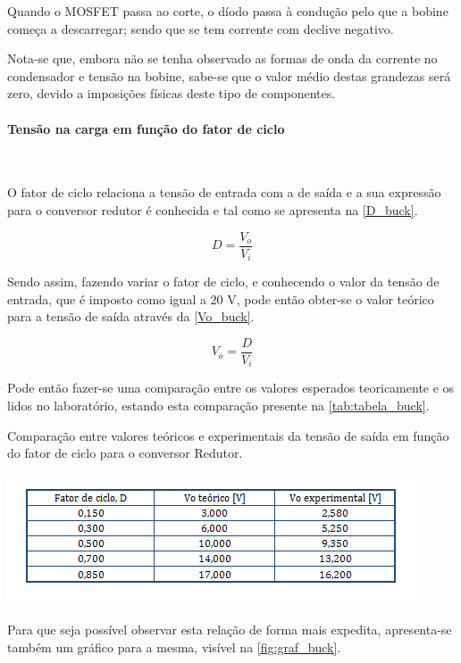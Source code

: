 \documentclass[a4paper,11pt]{article}
\numberwithin{equation}{section}
\begin{document}
Quando o MOSFET passa ao corte, o díodo passa à condução pelo que a bobine começa a descarregar; sendo que se tem corrente com declive negativo. 

Nota-se que, embora não se tenha observado as formas de onda da corrente no condensador e tensão na bobine, sabe-se que o valor médio destas grandezas será zero, devido a imposições físicas deste tipo de componentes.

\paragraph{Tensão na carga em função do fator de ciclo}\mbox{}\

O fator de ciclo relaciona a tensão de entrada com a de saída e a sua expressão para o conversor redutor é conhecida e tal como se apresenta na \autoref{D_buck}.

\begin{equation}
	D= \frac{V_o}{V_i} \label{D_buck}
\end{equation}

Sendo assim, fazendo variar o fator de ciclo, e conhecendo o valor da tensão de entrada, que é imposto como igual a $20$ V, pode então obter-se o valor teórico para a tensão de saída através da \autoref{Vo_buck}.

\begin{equation}
V_o= \frac{D}{V_i} \label{Vo_buck}
\end{equation}

Pode então fazer-se uma comparação entre os valores esperados teoricamente e os lidos no laboratório, estando esta comparação presente na \autoref{tab:tabela_buck}.

\begin{table}[!htb]
	\centering
	\caption{Comparação entre valores teóricos e experimentais da tensão de saída em função do fator de ciclo para o conversor Redutor.}
	\includegraphics[width=0.8\linewidth]{teoricas/tabela_buck}
	\label{tab:tabela_buck}
\end{table}

Para que seja possível observar esta relação de forma mais expedita, apresenta-se também um gráfico para a mesma, visível na \autoref{fig:graf_buck}.
\end{document}
